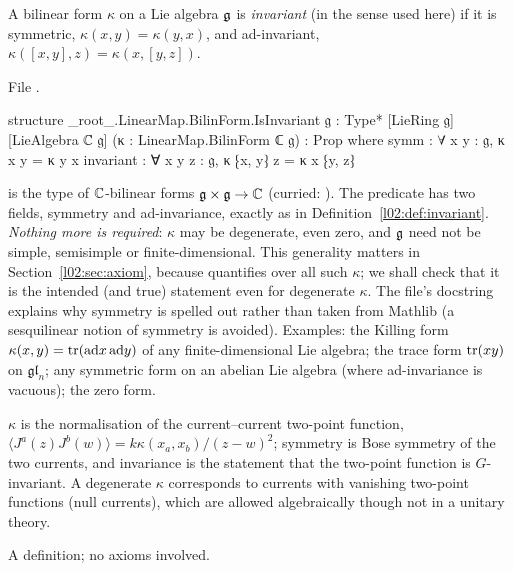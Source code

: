 \begin{definition}\label{l02:def:invariant}
A bilinear form $\kappa$ on a Lie algebra $\mathfrak{g}$ is \emph{invariant} (in the sense used here) if it
is symmetric, $\kappa(x,y) = \kappa(y,x)$, and ad-invariant, $\kappa([x,y],z) = \kappa(x,[y,z])$.
\end{definition}

File .
\begin{leancode}
structure _root_.LinearMap.BilinForm.IsInvariant {𝔤 : Type*} [LieRing 𝔤] [LieAlgebra ℂ 𝔤]
    (κ : LinearMap.BilinForm ℂ 𝔤) : Prop where
  symm : ∀ x y : 𝔤, κ x y = κ y x
  invariant : ∀ x y z : 𝔤, κ ⁅x, y⁆ z = κ x ⁅y, z⁆
\end{leancode}

\begin{dictionary}
 is the type of ${\mathbb{C}}$-bilinear forms $\mathfrak{g}\times\mathfrak{g}\to{\mathbb{C}}$
(curried: ). The predicate has two fields, symmetry and ad-invariance, exactly as in
Definition~\ref{l02:def:invariant}. \emph{Nothing more is required}: $\kappa$ may be degenerate,
even zero, and $\mathfrak{g}$ need not be simple, semisimple or finite-dimensional. This generality
matters in Section~\ref{l02:sec:axiom}, because  quantifies over all such $\kappa$; we
shall check that it is the intended (and true) statement even for degenerate $\kappa$. The file's docstring explains why
symmetry is spelled out rather than taken from Mathlib (a sesquilinear notion of symmetry is
avoided). Examples: the Killing form $\kappa(x,y) = \operatorname{tr}(\mathrm{ad}x\,\mathrm{ad}y)$ of any
finite-dimensional Lie algebra; the trace form $\operatorname{tr}(xy)$ on $\mathfrak{gl}_n$; any symmetric form on an abelian
Lie algebra (where ad-invariance is vacuous); the zero form.
\end{dictionary}

\begin{physics}
$\kappa$ is the normalisation of the current--current two-point function,
$\langle J^a(z)J^b(w)\rangle = k\kappa(x_a,x_b)/(z-w)^2$; symmetry is Bose symmetry of the two
currents, and invariance is the statement that the two-point function is $G$-invariant. A
degenerate $\kappa$ corresponds to currents with vanishing two-point functions (null currents),
which are allowed algebraically though not in a unitary theory.
\end{physics}

\begin{status}
A definition; no axioms involved.
\end{status}

